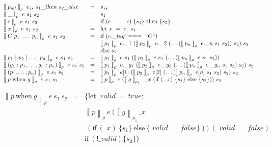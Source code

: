 \documentclass[12pt]{matmex-diploma}
\newcommand \llpar  {\mathrel{{\llbracket}}}
\newcommand \rrpar  {\mathrel{{\rrbracket}}}
\begin{document}
\begin{center}
$
\begin{array}{lll}
\llpar p_{ml} \rrpar _{\rho} ~ e_{js} ~ s_1\_then ~ s_2\_else &=& s_{js} \\
\llpar \_ \rrpar _{\rho} ~ e ~ s_1 ~ s_2 &=& s_1 \\
\llpar c \rrpar _{\rho} ~ e ~ s_1 ~ s_2 &=& \mbox{if} ~(e ~==~ c)~ \{ s_1 \} ~ \mbox{then} ~ \{ s_2 \} \\
\llpar x \rrpar _{\rho} ~ e ~ s_1 ~ s_2 &=& \mbox{let} ~ x ~=~ e; ~ s_1 \\

\llpar C~p_1 ~\ldots~ p_n \rrpar _{\rho} ~ e ~ s_1 ~ s_2 &=& \mbox{if} ~(e.\_tag ~===~ ``C``)\\ 
& & \llpar p_1 \rrpar _{\rho} ~ e.\_1 ~ (\llpar p_2 \rrpar _{\rho} ~ e.\_2 ~ (\ldots (\llpar p_n \rrpar _{\rho} ~e.\_n ~ s_1 ~ s_2)) ~s_2)~s_2 \\
& & \mbox{else} ~ s_2 \\

\llpar p_1~|~p_2~|\ldots|~p_n \rrpar _{\rho} ~ e ~ s_1 ~ s_2 &=& \llpar p_1 \rrpar _{\rho} ~ e ~ s_1 ~ (\llpar p_2 \rrpar _{\rho} ~ e ~ s_1 ~(\ldots (\llpar p_n \rrpar _{\rho} ~ e ~ s_1 ~ s_2)) \\

\llpar (g_1:p_1, \ldots, g_n:p_n) \rrpar _{\rho} ~ e ~ s_1 ~ s_2 &=& \llpar p_1 \rrpar _{\rho} ~ e.\_g_1 ~ (\llpar p_2 \rrpar _{\rho} ~ e.\_g_2 ~(\ldots (\llpar p_n \rrpar _{\rho} ~ e.\_g_n ~ s_1 ~ s_2) ~ s_2)~ s_2 \\

\llpar (p_1, \ldots, p_n)  \rrpar _{\rho} ~ e ~ s_1 ~ s_2 &=& \llpar p_1 \rrpar _{\rho} ~ e[1] ~ (\llpar p_2 \rrpar _{\rho} ~ e[2] ~(\ldots (\llpar p_n \rrpar _{\rho} ~ e[n] ~ s_1 ~ s_2) ~ s_2)~ s_2 \\

\llpar p ~ \mbox{when} ~ g \rrpar _{\rho} ~ e ~ s_1 ~ s_2 &=& \llpar p \rrpar _{\rho} ~ e ~ (\llpar g \rrpar _{\rho_1} ~ \_x ~ (\mbox{if} ~ (\_x) ~ \{ s_1 \} ~ \mbox{else} ~ \{ s_2 \})) ~s_2
\end{array}
$
\captionsetup{type=lstlisting}
\label{tbl:tr_pm}
\end{center}
 
\begin{center}
$
\begin{array}{lll}
\llpar p ~ \mbox{when} ~ g \rrpar _{\rho} ~ e ~ s_1 ~ s_2 &=& \{ \mbox{let} ~ \_valid ~ = ~ true; \\ 
& & \llpar p \rrpar _{\rho} ~ e ~ (\llpar g \rrpar _{\rho_1} ~ \_x ~ \\
& & ~(\mbox{if} ~ (\_x) ~ \{ s_1 \} ~ \mbox{else} ~ \{ \_valid ~=~ false \})) ~ (\_valid ~=~ false) \\
& & \mbox{if} ~ (!\_valid) \{ s_2 \} \}
\end{array}
$
\captionsetup{type=lstlisting}
\label{tbl:tr_wos2}
\end{center}
\end{document}
